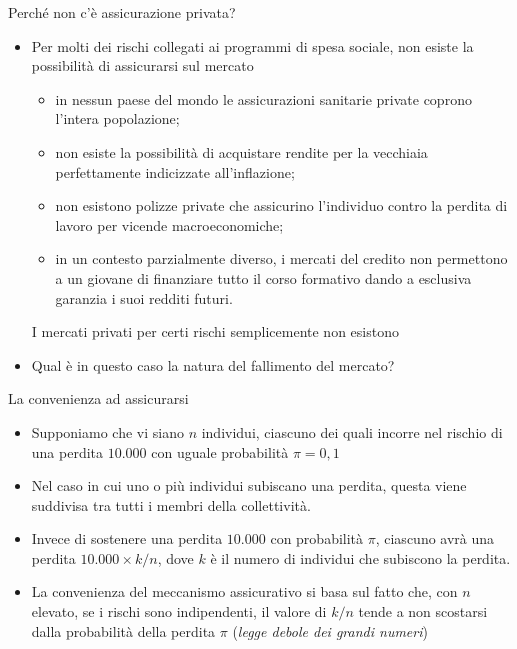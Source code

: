 \documentclass[aspectratio=149,11pt]{beamer}
\begin{document}
\begin{frame}{Perché non c'è assicurazione privata?}
\begin{itemize}
\item Per molti dei rischi collegati ai programmi di spesa sociale, non
esiste la possibilità di assicurarsi sul mercato
\begin{itemize}
\item in nessun paese del mondo le assicurazioni sanitarie private coprono
l'intera popolazione;
\item non esiste la possibilità di acquistare rendite per la vecchiaia
perfettamente indicizzate all'inflazione;
\item non esistono polizze private che assicurino l'individuo contro la perdita
di lavoro per vicende macroeconomiche;
\item in un contesto parzialmente diverso, i mercati del credito non permettono
a un giovane di finanziare tutto il corso formativo dando a esclusiva
garanzia i suoi redditi futuri.
\end{itemize}
I mercati privati per certi rischi semplicemente non esistono
\item Qual è in questo caso la natura del \alert{fallimento del mercato}?
\end{itemize}
\end{frame}

\begin{frame}{La convenienza ad assicurarsi}
\begin{itemize}
\item Supponiamo che vi siano \(n\) individui, ciascuno dei quali incorre nel
rischio di una perdita \(10.000\) con uguale probabilità \(\pi=0,1\)
\item Nel caso in cui uno o più individui subiscano una perdita, questa viene
suddivisa tra tutti i membri della collettività.
\item Invece di sostenere una perdita \(10.000\) con probabilità \(\pi\), ciascuno
avrà una perdita \(10.000\times k/n\), dove \(k\) è il numero di
individui che subiscono la perdita.
\item La convenienza del meccanismo assicurativo si basa sul fatto che, con \(n\)
elevato, \alert{se i rischi sono indipendenti}, il valore di \(k/n\) tende a non
scostarsi dalla probabilità della perdita \(\pi\) (\emph{legge debole dei grandi
numeri})
\end{itemize}
\end{frame}
\end{document}
